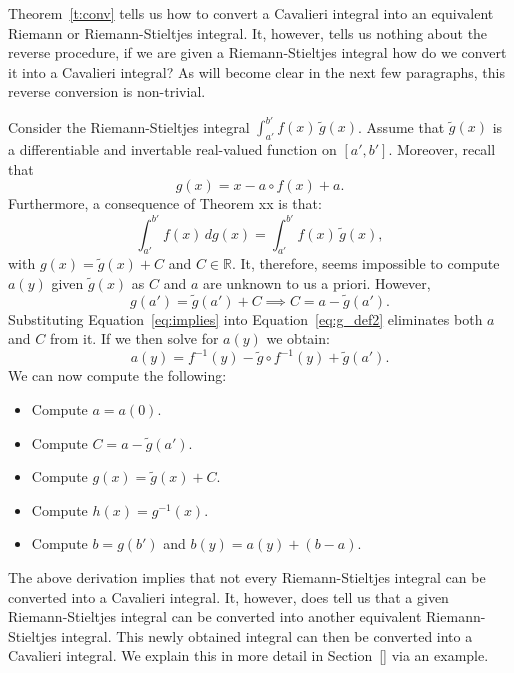 \documentclass[twoside,reqno,11pt]{fcaa-var} %
\begin{document}
Theorem~\ref{t:conv} tells us how to convert a Cavalieri integral into an equivalent Riemann or Riemann-Stieltjes integral. It, however, tells us nothing about the reverse 
procedure, if we are given a Riemann-Stieltjes integral how do we convert it into a Cavalieri integral? As will become clear in the next few paragraphs, this reverse 
conversion is non-trivial.

Consider the Riemann-Stieltjes integral $\int_{a'}^{b'} f(x)\,\widetilde{g}(x)$. Assume that $\widetilde{g}(x)$ is a differentiable and invertable real-valued function on $[a',b']$. Moreover, recall that 
\begin{equation}
\label{eq:g_def2}
g(x) = x - a\circ f(x) + a.
\end{equation}
Furthermore, a consequence of Theorem xx is that:
\begin{equation}
\int_{a'}^{b'} f(x)\,dg(x) = \int_{a'}^{b'}f(x)\,\widetilde{g}(x), 
\end{equation}
with $g(x) = \widetilde{g}(x) + C$ and $C\in\mathbb{R}$. It, therefore, seems impossible to compute $a(y)$ given $\widetilde{g}(x)$ as $C$ and $a$ are unknown to us a priori. However, 
\begin{equation}
\label{eq:implies}
g(a') = \widetilde{g}(a') + C \implies C = a - \widetilde{g}(a'). 
\end{equation}
Substituting Equation~\eqref{eq:implies} into Equation~\eqref{eq:g_def2} eliminates
both $a$ and $C$ from it. If we then solve for $a(y)$ we obtain:
\begin{equation}
a(y) = f^{-1}(y)-\widetilde{g}\circ f^{-1}(y) + \widetilde{g}(a'). 
\end{equation}
We can now compute the following:
\begin{itemize}
\item Compute $a = a(0)$.
\item Compute $C = a - \widetilde{g}(a')$.
\item Compute $g(x) = \widetilde{g}(x) + C$.
\item Compute $h(x) = g^{-1}(x)$.
\item Compute $b = g(b')$ and $b(y) = a(y) + (b-a)$.
\end{itemize}

The above derivation implies that not every Riemann-Stieltjes integral can be converted into a Cavalieri integral. It, however, does tell us that a given Riemann-Stieltjes integral can be converted into another equivalent Riemann-Stieltjes integral. This newly obtained integral can then be converted into a Cavalieri integral. We explain this in more detail in Section~\ref{} via an example. 
\end{document}
